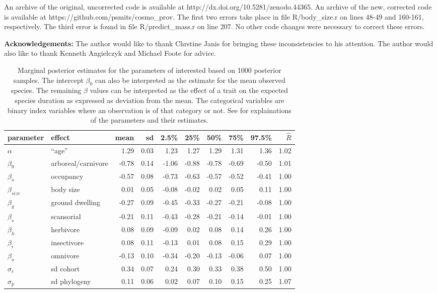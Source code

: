 \documentclass{article}
\begin{document}
An archive of the original, uncorrected code is available at http://dx.doi.org/10.5281/zenodo.44365. An archive of the new, corrected code is available at https://github.com/psmits/cosmo\_prov. The first two errors take place in file R/body\_size.r on lines 48-49 and 160-161, respectively. The third error is found in file R/predict\_mass.r on line 207. No other code changes were necessary to correct these errors.

\textbf{Acknowledgements:} The author would like to thank Chrstine Janis for bringing these inconsistencies to his attention. The author would also like to thank Kenneth Angielczyk and Michael Foote for advice.

\begin{table}[c]
  \centering
  \caption{Marginal posterior estimates for the parameters of interested based on 1000 posterior samples. The intercept \(\beta_{0}\) can also be interpreted as the estimate for the mean observed species. The remaining \(\beta\) values can be interpreted as the effect of a trait on the expected species duration as expressed as deviation from the mean. The categorical variables are binary index variables where an observation is of that category or not. See \citet{Smits2015} for explainations of the parameters and their estimates.}
  \begin{tabular}{ l l r r r r r r r r }
    parameter & effect & mean & sd & 2.5\% & 25\% & 50\% & 75\% & 97.5\% & \(\hat{R}\) \\ 
    \hline
    \(\alpha\) & ``age'' &1.29 & 0.03 & 1.23 & 1.27 & 1.29 & 1.31 & 1.36 & 1.02 \\ 
    \hline
    \(\beta_{0}\) & arboreal/carnivore & -0.78 & 0.14 & -1.06 & -0.88 & -0.78 & -0.69 & -0.50 & 1.01 \\ 
    \(\beta_{o}\) & occupancy & -0.57 & 0.08 & -0.73 & -0.63 & -0.57 & -0.52 & -0.41 & 1.00 \\ 
    \(\beta_{size}\) & body size & 0.01 & 0.05 & -0.08 & -0.02 & 0.02 & 0.05 & 0.11 & 1.00 \\ 
    \(\beta_{g}\) & ground dwelling & -0.27 & 0.09 & -0.45 & -0.33 & -0.27 & -0.21 & -0.08 & 1.00 \\ 
    \(\beta_{s}\) & scansorial & -0.21 & 0.11 & -0.43 & -0.28 & -0.21 & -0.14 & -0.01 & 1.00 \\ 
    \(\beta_{h}\) & herbivore & 0.08 & 0.09 & -0.09 & 0.02 & 0.08 & 0.14 & 0.26 & 1.00 \\ 
    \(\beta_{i}\) & insectivore & 0.08 & 0.11 & -0.13 & 0.01 & 0.08 & 0.15 & 0.29 & 1.00 \\ 
    \(\beta_{o}\) & omnivore & -0.13 & 0.10 & -0.34 & -0.20 & -0.13 & -0.06 & 0.07 & 1.00 \\ 
    \hline
    \(\sigma_{c}\) & sd cohort & 0.34 & 0.07 & 0.24 & 0.30 & 0.33 & 0.38 & 0.50 & 1.00 \\ 
    \(\sigma_{p}\) & sd phylogeny & 0.11 & 0.06 & 0.02 & 0.07 & 0.10 & 0.15 & 0.25 & 1.07 \\ 
    \hline
  \end{tabular}
  \label{tab:new_res}
\end{table}



\pagebreak 


%

\end{document}
